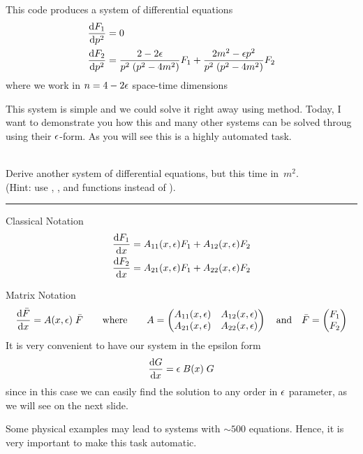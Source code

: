 \documentclass[11pt]{article}
\newcommand{\titleb}[2]{{\color{Blue}{\LARGE #1}\hfill{\Large #2}\vspace{-2mm}\par\rule{\textwidth}{1pt}\vs}}
\newcommand{\titlea}[1]{\titleb{#1}{}}
\begin{document}
\bi
  \item This code produces a system of differential equations
  $$
    \begin{aligned}
     \frac{\mathrm{d} F_1}{\mathrm{d} p^2} & = 0
     \\
     \frac{\mathrm{d} F_2}{\mathrm{d} p^2} & = \frac{2-2\epsilon}{p^2\;(p^2-4m^2)} F_1 + \frac{2m^2-\epsilon p^2}{p^2\;(p^2-4m^2)} F_2
    \end{aligned}
  $$
  where we work in $n=4-2\epsilon$ space-time dimensions
\ei
\vs

This system is simple and we could solve it right away using {\em <your favourite>} method.
Today, I want to demonstrate you how this and many other systems can be solved throug using their $\epsilon$-form.
As you will see this is a highly automated task.

\vs
{} \\
Derive another system of differential equations, but this time in~$m^2$.\\
(Hint: use , , and  functions instead of ).
\newpage


\titlea{I. Epsilon Form}
\bi
  \item Classical Notation
$$
\begin{aligned}
 \frac{\mathrm{d} F_1}{\mathrm{d} x} & = A_{11}(x,\epsilon) F_1 + A_{12}(x,\epsilon) F_2
 \\
 \frac{\mathrm{d} F_2}{\mathrm{d} x} & = A_{21}(x,\epsilon) F_1 + A_{22}(x,\epsilon) F_2
\end{aligned}
$$
  \item Matrix Notation
$$
\frac{\mathrm{d} \bar{F}}{\mathrm{d} x} = A(x,\epsilon) \; \bar{F}
\qquad \text{where}\qquad
A=
\begin{pmatrix}
  A_{11}(x,\epsilon) & A_{12}(x,\epsilon) \\
  A_{21}(x,\epsilon) & A_{22}(x,\epsilon)
 \end{pmatrix}
\quad \text{and}\quad
\bar{F}=
\begin{pmatrix}
  F_1 \\
  F_2
 \end{pmatrix}
$$
\ei
It is very convenient to have our system in the epsilon form
$$
\frac{\mathrm{d} G}{\mathrm{d} x} = \epsilon \; B(x) \; G
$$%
since in this case we can easily find the solution to any order in $\epsilon$ parameter, as we will see on the next slide.

Some physical examples may lead to systems with $\sim 500$ equations.
Hence, it is very important to make this task automatic.
\newpage
\end{document}
